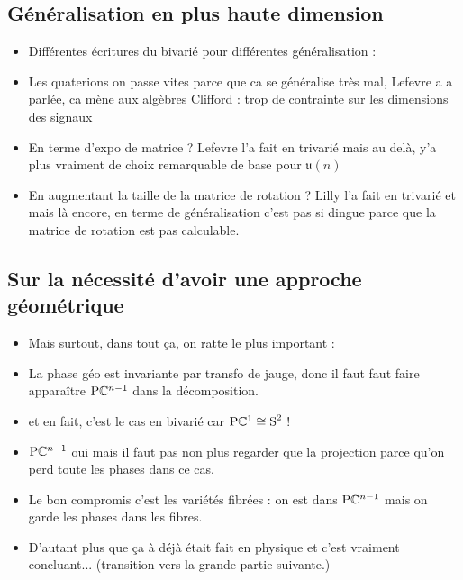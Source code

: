 \subsection{Généralisation en plus haute dimension} \label{subsec:gene_AM-FM-PM}

\begin{itemize}
	
	\item Différentes écritures du bivarié pour différentes généralisation :
	
	\item Les quaterions on passe vites parce que ca se généralise très mal, Lefevre a a parlée, ca mène aux algèbres Clifford : trop de contrainte sur les dimensions des signaux
	
	\item En terme d'expo de matrice ? Lefevre \cite[sec. I.3]{lefevre_polarization_2021} l'a fait en trivarié mais au delà, y'a plus vraiment de choix remarquable de base pour $\mathfrak{u}(n)$
	
	\item En augmentant la taille de la matrice de rotation ? Lilly \cite{lilly_modulated_2011} l'a fait en trivarié et mais là encore, en terme de généralisation c'est pas si dingue parce que la matrice de rotation est pas calculable.
	
\end{itemize}
	


\subsection{Sur la nécessité d'avoir une approche géométrique}\label{subsec:aller_plus_loin}
\begin{itemize}
	
	\item Mais surtout, dans tout ça, on ratte le plus important :
	
	\item La phase géo est invariante par transfo de jauge, donc il faut faut faire apparaître $\text{\normalfont P}\mathbb{C}^{n-1}$ dans la décomposition.
	
	\item et en fait, c'est le cas en bivarié car $\text{\normalfont P}\mathbb{C}^{1}\cong \text{\normalfont S}^{2}$ !
	
	\item $\text{\normalfont P}\mathbb{C}^{n-1}$ oui mais il faut pas non plus regarder que la projection parce qu'on perd toute les phases dans ce cas.
	
	\item Le bon compromis c'est les variétés fibrées : on est dans $\text{\normalfont P}\mathbb{C}^{n-1}$ mais on garde les phases dans les fibres.
	
	\item D'autant plus que ça à déjà était fait en physique et c'est vraiment concluant... (transition vers la grande partie suivante.)
	
\end{itemize}





